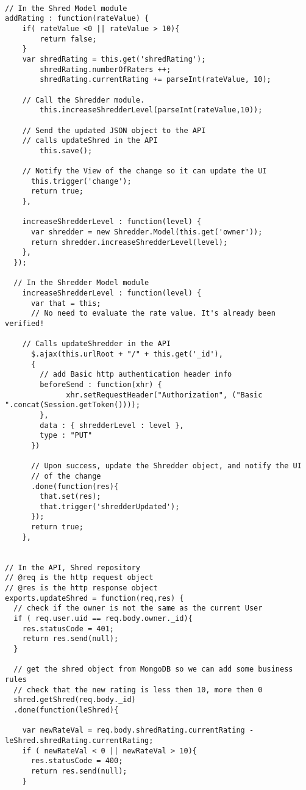 \begin{lstlisting}

// In the Shred Model module
addRating : function(rateValue) { 
	if( rateValue <0 || rateValue > 10){
		return false;
	}
	var shredRating = this.get('shredRating');
      	shredRating.numberOfRaters ++;
      	shredRating.currentRating += parseInt(rateValue, 10);     
	
	// Call the Shredder module. 
      	this.increaseShredderLevel(parseInt(rateValue,10));

	// Send the updated JSON object to the API
	// calls updateShred in the API
      	this.save();
	
	// Notify the View of the change so it can update the UI
      this.trigger('change');
      return true;
    },
    
    increaseShredderLevel : function(level) {
      var shredder = new Shredder.Model(this.get('owner'));
      return shredder.increaseShredderLevel(level);
    },
  });
  
  // In the Shredder Model module  
    increaseShredderLevel : function(level) {
      var that = this;
      // No need to evaluate the rate value. It's already been verified!

	// Calls updateShredder in the API
      $.ajax(this.urlRoot + "/" + this.get('_id'),
      { 
        // add Basic http authentication header info
        beforeSend : function(xhr) {
              xhr.setRequestHeader("Authorization", ("Basic 		".concat(Session.getToken())));
        },
        data : { shredderLevel : level },
        type : "PUT"
      })
      
      // Upon success, update the Shredder object, and notify the UI
      // of the change
      .done(function(res){
        that.set(res);
        that.trigger('shredderUpdated');
      });
      return true;
    },
  
  
// In the API, Shred repository
// @req is the http request object
// @res is the http response object 
exports.updateShred = function(req,res) {
  // check if the owner is not the same as the current User
  if ( req.user.uid == req.body.owner._id){
    res.statusCode = 401;
    return res.send(null);
  }

  // get the shred object from MongoDB so we can add some business rules
  // check that the new rating is less then 10, more then 0
  shred.getShred(req.body._id)
  .done(function(leShred){

    var newRateVal = req.body.shredRating.currentRating - 						leShred.shredRating.currentRating;
    if ( newRateVal < 0 || newRateVal > 10){
      res.statusCode = 400;
      return res.send(null);
    }


\end{lstlisting}

